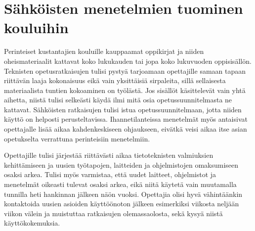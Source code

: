 \documentclass[utf8,bachelor]{gradu3}
\begin{document}


\section{Sähköisten menetelmien tuominen kouluihin}


Perinteiset kustantajien kouluille kauppaamat oppikirjat ja niiden oheismateriaalit kattavat koko lukukauden tai jopa koko lukuvuoden oppisisällön. Teknisten opetusratkaisujen tulisi pystyä tarjoamaan opettajille samaan tapaan riittävän laaja kokonaisuus eikä vain yksittäisiä sirpaleita, sillä sellaisesta materiaalista tuntien kokoaminen on työlästä. Jos sisällöt käsittelevät vain yhtä aihetta, niistä tulisi selkeästi käydä ilmi mitä osia opetussuunnitelmasta ne kattavat. Sähköisten ratkaisujen tulisi istua opetussuunnitelmaan, jotta niiden käyttö on helposti perusteltavissa. Ihannetilanteissa menetelmät myös antaisivat opettajalle lisää aikaa kahdenkeskiseen ohjaukseen, eivätkä veisi aikaa itse asian opetukselta verrattuna perinteisiin menetelmiin.

Opettajille tulisi järjestää riittävästi aikaa tietoteknisten valmiuksien kehittämiseen ja uusien työtapojen, laitteiden ja ohjelmistojen omaksumiseen osaksi arkea. Tulisi myös varmistaa, että uudet laitteet, ohjelmistot ja menetelmät oikeasti tulevat osaksi arkea, eikä niitä käytetä vain muutamalla tunnilla heti hankinnan jälkeen näön vuoksi. Opettajia olisi hyvä vähintäänkin kontaktoida uusien asioiden käyttöönoton jälkeen esimerkiksi viikosta neljään viikon välein ja muistuttaa ratkaisujen olemassaolosta, sekä kysyä niistä käyttökokemuksia.
\end{document}
